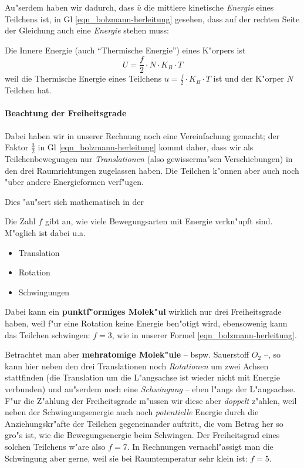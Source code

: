 Au"serdem haben wir dadurch, dass $\bar u$ die mittlere kinetische
\emph{Energie} eines Teilchens ist, in Gl
\eqref{eqn_bolzmann-herleitung} gesehen, dass auf der rechten Seite
der Gleichung auch eine \emph{Energie} stehen muss:
\begin{Def}
   Die Innere Energie (auch "`Thermische Energie"') eines K"orpers
 ist
   \begin{equation}
      \label{eqn_thermische-energie}
      \boxed{ U = \frac{f}{2} \cdot N \cdot K_B \cdot T }
   \end{equation}
   weil die Thermische Energie eines Teilchens $u = \frac{f}{2} \cdot
   K_B \cdot T$ ist und der K"orper $N$ Teilchen hat.
\end{Def}




\paragraph{Beachtung der Freiheitsgrade}
\label{kap_beachtung-freiheitsgrade}

Dabei haben wir in unserer Rechnung noch eine Vereinfachung gemacht;
der Faktor $\frac{3}{2}$ in Gl \eqref{eqn_bolzmann-herleitung} kommt
daher, dass wir als Teilchenbewegungen nur \emph{Translationen} (also
gewisserma"sen Verschiebungen) in den drei Raumrichtungen zugelassen
haben. Die Teilchen k"onnen aber auch noch "uber andere Energieformen
verf"ugen. 

Dies "au"sert sich mathematisch in der 
\begin{Def}
   Die Zahl $f$ gibt an, wie viele Bewegungsarten mit Energie
   verkn"upft sind. M"oglich ist dabei u.a.
   \begin{itemize}
   \item Translation 
\item Rotation
\item Schwingungen
   \end{itemize}
\end{Def}
Dabei kann ein \textbf{punktf"ormiges Molek"ul} wirklich nur drei Freiheitsgrade
haben, weil f"ur eine Rotation keine Energie ben"otigt wird, ebensowenig
kann das Teilchen schwingen: ${f = 3}$, wie in unserer Formel
\eqref{eqn_bolzmann-herleitung}.

Betrachtet man aber \textbf{mehratomige Molek"ule} -- bspw. Sauerstoff $O_2$ --,
so kann hier neben den drei Translationen noch \emph{Rotationen} um
zwei Achsen stattfinden (die Translation um die L"angsachse ist wieder
nicht mit Energie verbunden) und au"serdem noch eine \emph{Schwingung}
-- eben l"angs der L"angsachse. F"ur die Z"ahlung der Freiheitsgrade
m"ussen wir diese aber \emph{doppelt} z"ahlen, weil neben der
Schwingungsenergie auch noch \emph{potentielle} Energie durch die
Anziehungskr"afte der Teilchen gegeneinander auftritt, die vom Betrag
her so gro"s ist, wie die Bewegungsenergie beim Schwingen. Der
Freiheitsgrad eines solchen Teilchens w"are also ${f =
  7}$. In Rechnungen vernachl"assigt man die Schwingung aber gerne,
weil sie bei Raumtemperatur sehr klein ist: ${f = 5}$.

